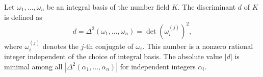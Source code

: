 Let $\omega_1, \ldots, \omega_n$ be an integral basis of the number field $K$. The discriminant $d$ of $K$ is defined as
$$d = \Delta^2(\omega_1, \ldots, \omega_n) = \det(\omega_i^{(j)})^2,$$
where $\omega_i^{(j)}$ denotes the $j$-th conjugate of $\omega_i$. This number is a nonzero rational integer independent of the choice of integral basis. The absolute value $|d|$ is minimal among all $|\Delta^2(\alpha_1,\ldots,\alpha_n)|$ for independent integers $\alpha_i$.
